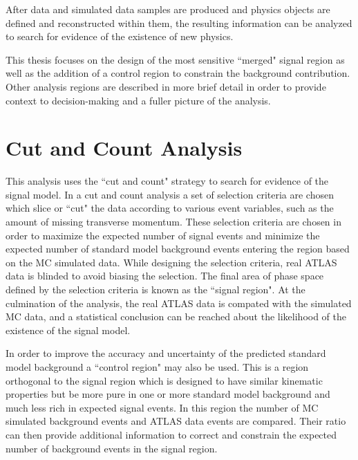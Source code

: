 \label{chapter:analysis}
After data and simulated data samples are produced and physics objects are defined and reconstructed within them, the resulting information can be analyzed to search for evidence of the existence of new physics.

This thesis focuses on the design of the most sensitive ``merged" signal region as well as the addition of a control region to constrain the \ttbar background contribution. Other analysis regions are described in more brief detail in order to provide context to decision-making and a fuller picture of the analysis.

\section{Cut and Count Analysis}
This analysis uses the ``cut and count" strategy to search for evidence of the signal model. In a cut and count analysis a set of selection criteria are chosen which slice or ``cut" the data according to various event variables, such as the amount of missing transverse momentum. These selection criteria are chosen in order to maximize the expected number of signal events and minimize the expected number of standard model background events entering the region based on the MC simulated data. While designing the selection criteria, real ATLAS data is blinded to avoid biasing the selection. The final area of phase space defined by the selection criteria is known as the ``signal region". At the culmination of the analysis, the real ATLAS data is compated with the simulated MC data, and a statistical conclusion can be reached about the likelihood of the existence of the signal model.

In order to improve the accuracy and uncertainty of the predicted standard model background a ``control region" may also be used. This is a region orthogonal to the signal region which is designed to have similar kinematic properties but be more pure in one or more standard model background and much less rich in expected signal events. In this region the number of MC simulated background events and ATLAS data events are compared. Their ratio can then provide additional information to correct and constrain the expected number of background events in the signal region.

